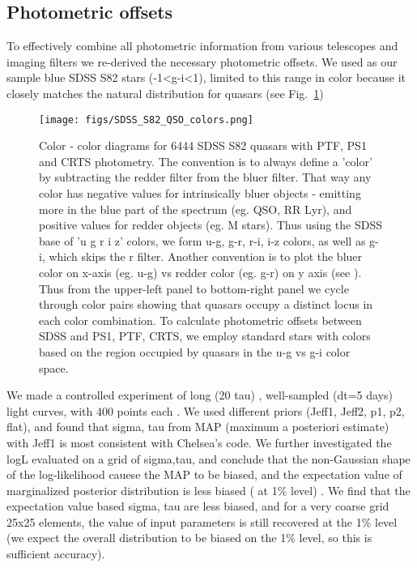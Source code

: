 \documentclass[fleqn,usenatbib]{mnras}  %
\begin{document}
\subsection{Photometric offsets}

To effectively combine all photometric information from various telescopes and imaging filters we re-derived the necessary photometric offsets. We used as our sample blue SDSS S82 stars (-1<g-i<1), limited to this range in color because it closely matches the natural distribution for quasars (see Fig.~\ref{fig:quasar_colors})


\begin{figure}
\texttt{[image: figs/SDSS\_S82\_QSO\_colors.png]}
\caption{Color - color diagrams for 6444 SDSS S82 quasars with PTF, PS1 and CRTS photometry. The convention is to always define a 'color' by subtracting the redder filter from the bluer filter. That way any color has negative values for intrinsically bluer objects - emitting more in the blue part of the spectrum (eg. QSO, RR Lyr), and positive values for redder objects (eg. M stars). Thus using the SDSS base of 'u g r i z' colors,  we form u-g, g-r,  r-i, i-z  colors, as well as g-i, which skips the r filter. Another convention is to plot the bluer color on x-axis (eg. u-g) vs redder color (eg. g-r) on y axis (see \citealt{ivezic2002,sesar2007}). Thus from the upper-left panel to bottom-right panel we cycle through color pairs showing that quasars occupy a distinct locus in each color combination. To calculate photometric offsets between SDSS and PS1, PTF, CRTS, we employ standard stars with colors based on the region occupied by quasars in the u-g vs g-i color space. }
\label{fig:quasar_colors}
\end{figure} 

% 



We made a controlled experiment of long (20 tau) , well-sampled (dt=5 days) light curves,  with 400 points each . We used different priors (Jeff1, Jeff2, p1, p2, flat), and found that  sigma, tau from MAP (maximum a posteriori estimate) with Jeff1 is most consistent with Chelsea's code. We further investigated the logL evaluated on  a grid of sigma,tau, and conclude that the non-Gaussian shape of  the log-likelihood cauese the MAP to be biased, and the expectation value of marginalized posterior distribution is less biased  ( at 1\% level) . We find that the expectation value based sigma, tau are less biased, and for a very coarse grid 25x25 elements, the value of input parameters is  still recovered at the 1\% level (we expect the overall distribution to be biased on the 1\% level, so this is sufficient accuracy). 
\end{document}
